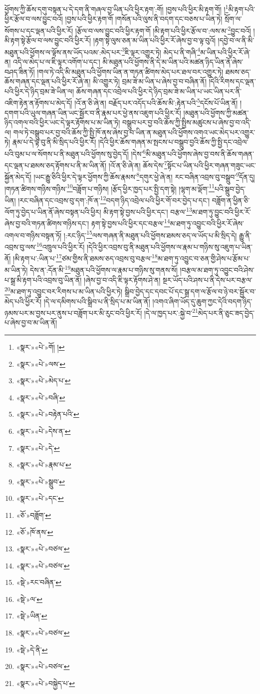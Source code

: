 ཕྱོགས་ཀྱི་ཆོས་དགུ་བསྟན་པ་དེ་དག་ནི་གཞལ་བྱ་ཡིན་པའི་ཕྱིར་རྟག་:གོ། །བྱས་པའི་ཕྱིར་མི་རྟག་གོ། །\footnote{«སྣར་»«པེ་»གོ། །}མི་རྟག་པའི་ཕྱིར་རྩོལ་བ་ལས་བྱུང་བའོ། །བྱས་པའི་ཕྱིར་རྟག་གོ །གསོན་པའི་ལུས་ནི་བདག་དང་བཅས་པ་ཡིན་ཏེ། སྲོག་ལ་སོགས་པ་དང་ལྡན་པའི་ཕྱིར་རོ། །རྩོལ་བ་ལས་བྱུང་བའི་ཕྱིར་རྟག་གོ །མི་རྟག་པའི་ཕྱིར་རྩོལ་བ་:ལས་མ་\footnote{«སྣར་»«པེ་»ལས་}བྱུང་བའོ། །མི་རྟག་སྟེ་རྩོལ་བ་ལས་བྱུང་བའི་ཕྱིར་རོ། །རྟག་སྟེ་ལུས་ཅན་མ་ཡིན་པའི་ཕྱིར་རོ་ཞེས་བྱ་བ་ལྟ་བུའོ། །དབྱེ་བ་ལ་ནི་མི་མཐུན་པའི་ཕྱོགས་ལ་ལྟོས་ནས་ཡོད་པའམ་:མེད་པར་\footnote{«སྣར་»«པེ་»མེད་པ་}ཇི་ལྟར་འགྱུར་ཏེ། མེད་པ་ནི་གཞི་\footnote{«སྣར་»«པེ་»བཞི་}མ་ཡིན་པའི་ཕྱིར་རོ་ཞེ་ན། འདི་ལ་མེད་པ་ལ་ཇི་ལྟར་འགོག་པ་དང་། མི་མཐུན་པའི་ཕྱོགས་ནི་དེ་མ་ཡིན་པའི་མཚན་ཉིད་ཡིན་ནོ་ཞེས་བཤད་ཟིན་ཏོ། །གལ་ཏེ་འདི་མི་མཐུན་པའི་ཕྱོགས་ཡིན་ན་གཏན་ཚིགས་མེད་པར་ཐལ་བར་འགྱུར་ཏེ། ཐམས་ཅད་ཆོས་གཞན་དང་ལྡན་པའི་ཕྱིར་རོ་ཞེ་ན། མི་འགྱུར་ཏེ། བྲམ་ཟེ་མ་ཡིན་པ་ཞེས་བྱ་བ་བཞིན་ནོ། །དེའི་རིགས་དང་ལྡན་པའི་ཕྱིར་དེ་ཉིད་བྲམ་ཟེ་ཡིན་ལ། ཆོས་གཞན་དང་འབྲེལ་པའི་ཕྱིར་དེ་ཉིད་བྲམ་ཟེ་མ་ཡིན་པ་ཡང་ཡིན་པར་ནི་འཇིག་རྟེན་ན་རྟོགས་པ་མེད་དོ། །འོ་ན་ཅི་ཞེ་ན། བརྗོད་པར་འདོད་པའི་ཆོས་མི་:རྟེན་པའི་\footnote{«སྣར་»«པེ་»བརྟེན་པའི་}དངོས་པོ་ཡིན་ནོ། །དགག་པའི་ཡུལ་གཞན་ཡིན་ཡང་སྦྱོར་བ་ནི་རྣམ་པར་ཕྱེ་ནས་འཇུག་པའི་ཕྱིར་རོ། །མཐུན་པའི་ཕྱོགས་ཀྱི་མཚན་ཉིད་འགལ་བའི་ཕྱིར་ཡང་དེ་ལྟར་རྟོགས་པ་མ་ཡིན་ཏེ། བསྒྲུབ་པར་བྱ་བའི་ཆོས་ཀྱི་སྤྱིས་མཚུངས་པ་ཞེས་བྱ་བ་འདི་ལ། གལ་ཏེ་བསྒྲུབ་པར་བྱ་བའི་ཆོས་ཀྱི་སྤྱི་ཁོ་ནས་ཞེས་བྱ་བ་ཡིན་ན་མཐུན་པའི་ཕྱོགས་འགའ་ཡང་མེད་པར་འགྱུར་ཏེ། རྣམ་པ་དེ་ལྟ་བུ་ནི་མི་སྲིད་པའི་ཕྱིར་རོ། །དེའི་ཕྱིར་ཆོས་གཞན་མ་སྤངས་པ་བསྒྲུབ་བྱའི་ཆོས་ཀྱི་སྤྱི་དང་འབྲེལ་པའི་བུམ་པ་ལ་སོགས་པ་ནི་མཐུན་པའི་ཕྱོགས་སུ་བྱེད་དོ། །དེས་\footnote{«སྣར་»«པེ་»དེས་ན་}མི་མཐུན་པའི་ཕྱོགས་ཞེས་བྱ་བས་ནི་ཆོས་གཞན་དང་ལྡན་པ་ཐམས་ཅད་རྟོགས་པ་ནི་མ་ཡིན་ནོ། །འོ་ན་ཅི་ཞེ་ན། ཆོས་དེས་\footnote{«སྣར་»«པེ་»དེ་}སྟོང་པ་ཡིན་པའི་ཕྱིར་གཞན་གཟུང་ཡང་སྐྱོན་མེད་དོ། །ཡང་རྒྱུ་ཅིའི་ཕྱིར་དེ་ལྟར་ཕྱོགས་ཀྱི་ཆོས་རྣམས་\footnote{«སྣར་»«པེ་»རྣམ་པ་}དགུར་ཕྱེ་ཞེ་ན། རང་བཞིན་འབྲས་བུ་བསྒྲུབ་\footnote{«སྣར་»«པེ་»སྒྲུབ་}དོན་དུ། །གཏན་ཚིགས་གཉིས་གཉིས་\footnote{«སྣར་»«པེ་»དང་}བཟློག་པ་གཉིས། །རྩོད་ཕྱིར་ཁྱད་པར་སྤྱི་དག་སྟེ། །ལྷག་མ་ལྡོག་\footnote{«ཅོ་»བཟློག་}པའི་སྒྲུབ་བྱེད་ཡིན། །རང་བཞིན་དང་འབྲས་བུ་དག་:ཁོ་ན་\footnote{«ཅོ་»ཁོ་ནས་}བདག་ཉིད་འབྲེལ་པའི་ཕྱིར་གོ་བར་བྱེད་པ་དང་། བཟློག་ན་ཕྱིན་ཅི་ལོག་ཏུ་བྱེད་པ་ཡིན་ནོ་ཞེས་བསྟན་པའི་ཕྱིར། མི་རྟག་སྟེ་བྱས་པའི་ཕྱིར་དང་། བརྩལ་\footnote{«སྣར་»«པེ་»བཙལ་}མ་ཐག་ཏུ་བྱུང་བའི་ཕྱིར་རོ་ཞེས་བྱ་བའི་གཏན་ཚིགས་གཉིས་དང་། རྟག་སྟེ་བྱས་པའི་ཕྱིར་དང་བརྩལ་\footnote{«སྣར་»«པེ་»བཙལ་}མ་ཐག་ཏུ་འབྱུང་བའི་ཕྱིར་རོ་ཞེས་འགལ་བ་གཉིས་བསྟན་ཏོ། །:རང་ཉིད་\footnote{«སྡེ་»རང་བཞིན་}ལས་གཞན་ནི་མཐུན་པའི་ཕྱོགས་ཐམས་ཅད་ལ་ཡོད་པ་མི་སྲིད་དེ། རྒྱུ་ནི་འབྲས་བུ་ལས་\footnote{«སྡེ་»ལ་}འཁྲུལ་པའི་ཕྱིར་རོ། །དེའི་ཕྱིར་འབྲས་བུ་ནི་མཐུན་པའི་ཕྱོགས་ལ་རྣམ་པ་གཉིས་སུ་འཇུག་པ་ཡིན་ནོ། །མི་རྟག་པ་:ཡིན་པ་\footnote{«སྡེ་»ཡིན་}ཙམ་གྱིས་ནི་ཐམས་ཅད་འབྲས་བུ་བརྩལ་\footnote{«སྣར་»«པེ་»བཙལ་}མ་ཐག་ཏུ་འབྱུང་བ་ཅན་གྱི་ཤེས་པ་རྩོམ་པ་མ་ཡིན་ཏེ། དེས་ན་:དོན་མི་\footnote{«སྡེ་»དེ་ནི་}མཐུན་པའི་ཕྱོགས་ལ་རྣམ་པ་གཉིས་སུ་གནས་སོ། །བརྩལ་མ་ཐག་ཏུ་འབྱུང་བའི་ཤེས་པ་སྒྲ་མི་རྟག་པའི་འབྲས་བུ་ཡིན་ནོ། །ཞེས་བྱ་བ་འདི་ཇི་ལྟར་རྟོགས་ཤེ་ན། སྔར་ཡོད་པའི་ཤས་པ་ནི་དེས་པར་བརྩལ་\footnote{«སྣར་»«པེ་»བཙལ་}མ་ཐག་ཏུ་འབྱུང་བར་རིགས་པ་མ་ཡིན་པའི་ཕྱིར་ཏེ། སྒྲིབ་བྱེད་དང་དབང་པོ་དང་སྒྲ་དག་ལ་རྩོལ་བ་ཉེ་བར་སྦྱོར་བ་མེད་པའི་ཕྱིར་རོ། །དེ་ལ་དམིགས་པའི་སྒྲིབ་པ་ནི་སྲིད་པ་མ་ཡིན་ནོ། །འགའ་ཞིག་ཡོད་དུ་ཆུག་ཀྱང་དེའི་བདག་ཉིད་ཉམས་པར་མ་བྱས་པར་ནུས་པ་བཟློག་པར་མི་རུང་བའི་ཕྱིར་རོ། །དེ་ལ་ཁྱད་པར་:སྐྱེ་བ་\footnote{«སྣར་»«པེ་»བསྐྱེད་པ་}མེད་པར་ནི་ཅུང་ཟད་བྱེད་པ་ཞེས་བྱ་བ་མ་ཡིན་ནོ། 